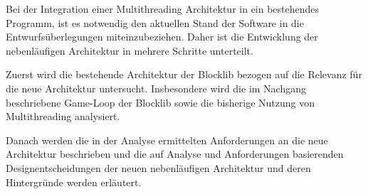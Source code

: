 Bei der Integration einer Multithreading Architektur in ein bestehendes \gls{Programm}, ist es notwendig den aktuellen Stand der Software in die Entwurfsüberlegungen miteinzubeziehen. Daher ist die Entwicklung der nebenläufigen Architektur in mehrere Schritte unterteilt.

Zuerst wird die bestehende Architektur der Blocklib bezogen auf die Relevanz für die neue Architektur untersucht. Insbesondere wird die im Nachgang beschriebene Game-Loop der Blocklib sowie die bisherige Nutzung von Multithreading analysiert.

Danach werden die in der Analyse ermittelten Anforderungen an die neue Architektur beschrieben und die auf Analyse und Anforderungen basierenden Designentscheidungen der neuen nebenläufigen Architektur und deren Hintergründe werden erläutert.